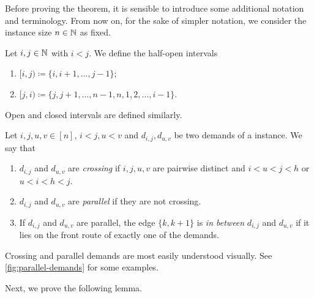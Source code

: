 Before proving the theorem, it is sensible to introduce some additional notation and terminology.
From now on, for the sake of simpler notation, we consider the \RRL instance size $n \in \mathbb{N}$ as fixed.
\begin{notation}
	Let $i, j \in \mathbb{N}$ with $i < j$.
	We define the half-open intervals
	\begin{enumerate}
 		\item $[i, j) \coloneqq \{i, i+1, \ldots, j-1\}$;
 		\item $[j, i) \coloneqq \{j, j+1, \ldots, n-1, n, 1, 2, \ldots, i-1\}$.
	\end{enumerate}
	Open and closed intervals are defined similarly.
\end{notation}
\begin{definition}
	Let $i, j, u, v \in [n]$, $i < j, u < v$ and $d_{i,j}, d_{u, v}$ be two demands of a \RRL instance.
	We say that
	\begin{enumerate}
		\item $d_{i, j}$ and $d_{u, v}$ are \emph{crossing} if $i, j, u, v$ are pairwise distinct and $i < u < j < h$ or $u < i < h < j$.
		\item $d_{i, j}$ and $d_{u, v}$ are \emph{parallel} if they are not crossing.
		\item If $d_{i, j}$ and $d_{u, v}$ are parallel, the edge $\{k, k+1\}$ is \emph{in between}
		$d_{i,j}$ and $d_{u, v}$ if it lies on the front route of exactly one of the demands.
	\end{enumerate}
\end{definition}
Crossing and parallel demands are most easily understood visually.
See \cref{fig:parallel-demands} for some examples.


Next, we prove the following lemma.

